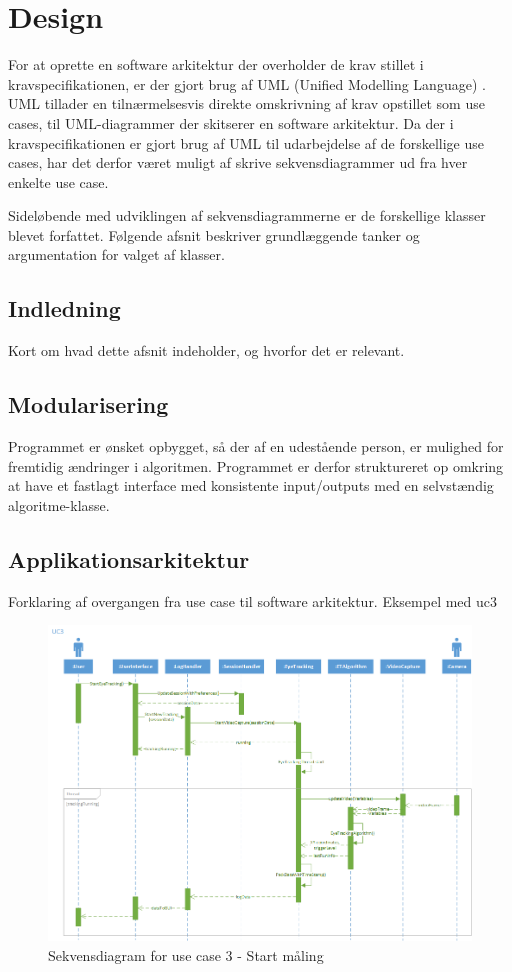 \documentclass[rapport.tex]{subfiles}
\begin{document}
	\section{Design}
	For at oprette en software arkitektur der overholder de krav stillet i kravspecifikationen, er der gjort brug af UML (Unified Modelling Language) \cite{UML}. UML tillader en tilnærmelsesvis direkte omskrivning af krav opstillet som use cases, til UML-diagrammer der skitserer en software arkitektur. 
	Da der i kravspecifikationen er gjort brug af UML til udarbejdelse af de forskellige use cases, har det derfor været muligt af skrive sekvensdiagrammer ud fra hver enkelte use case. 
	
	Sideløbende med udviklingen af sekvensdiagrammerne er de forskellige klasser blevet forfattet. Følgende afsnit beskriver grundlæggende tanker og argumentation for valget af klasser.
	\subsection{Indledning}
	Kort om hvad dette afsnit indeholder, og hvorfor det er relevant. 	
	\subsection{Modularisering}
	Programmet er ønsket opbygget, så der af en udestående person, er mulighed for fremtidig ændringer i algoritmen. Programmet er derfor struktureret op omkring at have et fastlagt interface med konsistente input/outputs med en selvstændig algoritme-klasse. 
	\subsection{Applikationsarkitektur}
	Forklaring af overgangen fra use case til software arkitektur. Eksempel med uc3
	
	\begin{figure}
		\centering
		\includegraphics[width=1\linewidth]{UC3}
		\caption[Sekvensdiagram - UC3]{Sekvensdiagram for use case 3 - Start måling}
		\label{fig:UC3}
	\end{figure}
	
\end{document}
